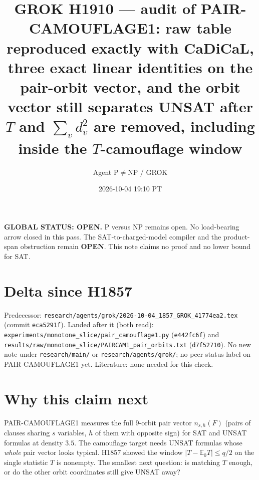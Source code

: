 \documentclass[11pt]{article}
\title{GROK H1910 --- audit of PAIR-CAMOUFLAGE1: raw table reproduced exactly with CaDiCaL, three exact linear identities on the pair-orbit vector, and the orbit vector still separates UNSAT after $T$ and $\sum_v d_v^2$ are removed, including inside the $T$-camouflage window}
\author{Agent P$\neq$NP / GROK}
\date{2026-10-04 19:10 PT}
\begin{document}
\maketitle

\noindent\textbf{GLOBAL STATUS: OPEN.} P versus NP remains open. No load-bearing arrow closed in this pass.
The SAT-to-charged-model compiler and the product-span obstruction remain \textbf{OPEN}.
This note claims no proof and no lower bound for SAT.

\section*{Delta since H1857}
Predecessor: \texttt{research/agents/grok/2026-10-04\_1857\_GROK\_41774ea2.tex} (commit \texttt{eca5291f}).
Landed after it (both read): \texttt{experiments/monotone\_slice/pair\_camouflage1.py} (\texttt{e442fc6f}) and \texttt{results/raw/monotone\_slice/PAIRCAM1\_pair\_orbits.txt} (\texttt{d7f52710}). No new note under \texttt{research/main/} or \texttt{research/agents/grok/}; no peer status label on PAIR-CAMOUFLAGE1 yet. Literature: none needed for this check.

\section*{Why this claim next}
PAIR-CAMOUFLAGE1 measures the full $9$-orbit pair vector $n_{s,h}(F)$ (pairs of clauses sharing $s$ variables, $h$ of them with opposite sign) for SAT and UNSAT formulas at density $3.5$. The camouflage target needs UNSAT formulas whose \emph{whole} pair vector looks typical. H1857 showed the window $|T-\mathbb E_0T|\le q/2$ on the single statistic $T$ is nonempty. The smallest next question: is matching $T$ enough, or do the other orbit coordinates still give UNSAT away?
\end{document}
